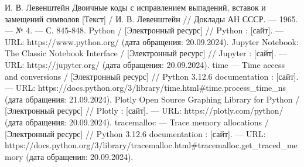 \begin{thebibliography}{}
	 И. В. Левенштейн  Двоичные коды с исправлением выпадений, вставок и замещений символов [Текст] / И. В. Левенштейн  // Доклады АН СССР. — 1965. — № 4. — С. 845-848.
	  Python /  [Электронный ресурс] // Python : [сайт]. — URL: https://www.python.org/ (дата обращения: 20.09.2024).
	  Jupyter Notebook: The Classic Notebook Interface /  [Электронный ресурс] // Jupyter : [сайт]. — URL: https://jupyter.org/ (дата обращения: 20.09.2024).
	  time — Time access and conversions /  [Электронный ресурс] // Python 3.12.6 documentation : [сайт]. — URL: https://docs.python.org/3/library/time.html\#time.process\_time\_ns (дата обращения: 21.09.2024).
	  Plotly Open Source Graphing Library for Python /  [Электронный ресурс] // Plotly : [сайт]. — URL: https://plotly.com/python/ (дата обращения: 20.09.2024).
	  tracemalloc — Trace memory allocations /  [Электронный ресурс] // Python 3.12.6 documentation : [сайт]. — URL: https://docs.python.org/3/library/tracemalloc.html\#tracemalloc.get\_traced\_memory (дата обращения: 20.09.2024).
\end{thebibliography}
